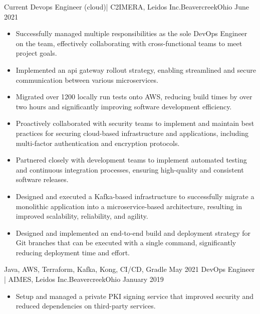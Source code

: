 %
%
%
\begin{experiences}

  \experience
  {Current} {Devops Engineer (cloud)| C2IMERA, Leidos Inc.}{Beavercreek}{Ohio}
  {June 2021} {
      \begin{itemize}
          \item Successfully managed multiple responsibilities as the sole DevOps Engineer on the team, effectively collaborating with cross-functional teams to meet project goals.
          \item Implemented an api gateway rollout strategy, enabling streamlined and secure communication between various microservices.
          \item Migrated over 1200 locally run tests onto AWS, reducing build times by over two hours and significantly improving software development efficiency.
          \item Proactively collaborated with security teams to implement and maintain best practices for securing cloud-based infrastructure and applications, including multi-factor authentication and encryption protocols.
          \item Partnered closely with development teams to implement automated testing and continuous integration processes, ensuring high-quality and consistent software releases.
          \item Designed and executed a Kafka-based infrastructure to successfully migrate a monolithic application into a microservice-based architecture, resulting in improved scalability, reliability, and agility.
          \item Designed and implemented an end-to-end build and deployment strategy for Git branches that can be executed with a single command, significantly reducing deployment time and effort.
      \end{itemize}
  }
  {Java, AWS, Terraform, Kafka, Kong, CI/CD, Gradle}
  \emptySeparator
  \experience
  {May 2021} {DevOps Engineer | AIMES, Leidos Inc.}{Beavercreek}{Ohio}
  {January 2019} {
      \begin{itemize}
          \item Setup and managed a private PKI signing service that improved security and reduced dependencies on third-party services.

\end{itemize}}
\end{experiences}
